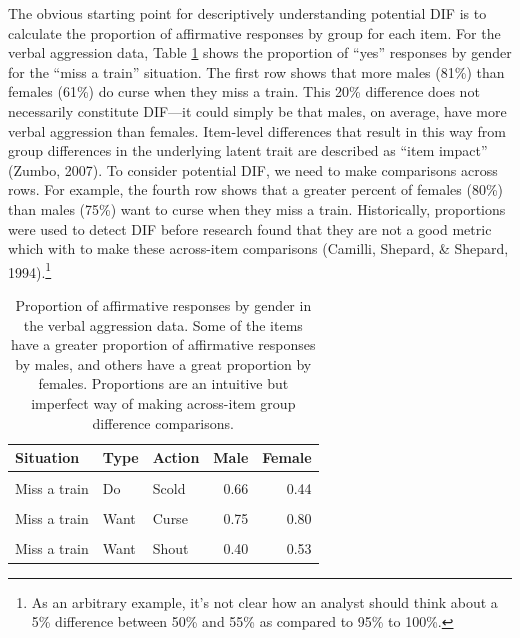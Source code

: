 \documentclass[
  english,
  man,floatsintext]{apa6}
\begin{document}
The obvious starting point for descriptively understanding potential DIF is to calculate the proportion of affirmative responses by group for each item. For the verbal aggression data, Table \ref{tab:pvalues} shows the proportion of ``yes'' responses by gender for the ``miss a train'' situation. The first row shows that more males (81\%) than females (61\%) do curse when they miss a train. This 20\% difference does not necessarily constitute DIF---it could simply be that males, on average, have more verbal aggression than females. Item-level differences that result in this way from group differences in the underlying latent trait are described as ``item impact'' (Zumbo, 2007). To consider potential DIF, we need to make comparisons across rows. For example, the fourth row shows that a greater percent of females (80\%) than males (75\%) want to curse when they miss a train. Historically, proportions were used to detect DIF before research found that they are not a good metric which with to make these across-item comparisons (Camilli, Shepard, \& Shepard, 1994).\footnote{As an arbitrary example, it's not clear how an analyst should think about a 5\% difference between 50\% and 55\% as compared to 95\% to 100\%.}

\begin{table}[H]

\caption{\label{tab:pvalues}Proportion of affirmative responses by gender in the verbal aggression data. Some of the items have a greater proportion of affirmative responses by males, and others have a great proportion by females. Proportions are an intuitive but imperfect way of making across-item group difference comparisons.}
\centering
\fontsize{10}{12}\selectfont
\begin{tabular}[t]{lllrr}
\toprule
Situation & Type & Action & Male & Female\\
\midrule
\cellcolor{gray!6}{Miss a train} & \cellcolor{gray!6}{Do} & \cellcolor{gray!6}{Curse} & \cellcolor{gray!6}{0.81} & \cellcolor{gray!6}{0.61}\\
Miss a train & Do & Scold & 0.66 & 0.44\\
\cellcolor{gray!6}{Miss a train} & \cellcolor{gray!6}{Do} & \cellcolor{gray!6}{Shout} & \cellcolor{gray!6}{0.29} & \cellcolor{gray!6}{0.23}\\
Miss a train & Want & Curse & 0.75 & 0.80\\
\cellcolor{gray!6}{Miss a train} & \cellcolor{gray!6}{Want} & \cellcolor{gray!6}{Scold} & \cellcolor{gray!6}{0.60} & \cellcolor{gray!6}{0.63}\\
\addlinespace
Miss a train & Want & Shout & 0.40 & 0.53\\
\bottomrule
\end{tabular}
\end{table}
\end{document}
